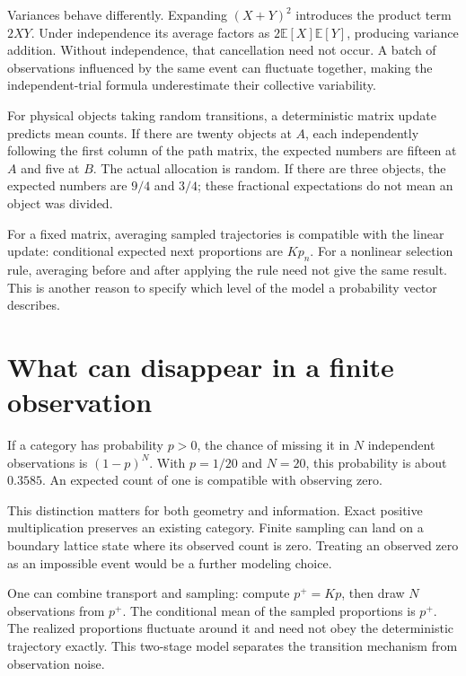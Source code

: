 \documentclass[11pt,oneside,openany]{book}
\theoremstyle{definition}
\theoremstyle{remark}
\numberwithin{equation}{chapter}
\begin{document}
Variances behave differently. Expanding \((X+Y)^2\) introduces the product term \(2XY\). Under independence its average factors as \(2\mathbb E[X]\mathbb E[Y]\), producing variance addition. Without independence, that cancellation need not occur. A batch of observations influenced by the same event can fluctuate together, making the independent-trial formula underestimate their collective variability.

For physical objects taking random transitions, a deterministic matrix update predicts mean counts. If there are twenty objects at \(A\), each independently following the first column of the path matrix, the expected numbers are fifteen at \(A\) and five at \(B\). The actual allocation is random. If there are three objects, the expected numbers are \(9/4\) and \(3/4\); these fractional expectations do not mean an object was divided.

For a fixed matrix, averaging sampled trajectories is compatible with the linear update: conditional expected next proportions are \(Kp_n\). For a nonlinear selection rule, averaging before and after applying the rule need not give the same result. This is another reason to specify which level of the model a probability vector describes.

\section{What can disappear in a finite observation}\label{ch04-what-can-disappear-in-a-finite-observation}

If a category has probability \(p>0\), the chance of missing it in \(N\) independent observations is \((1-p)^N\). With \(p=1/20\) and \(N=20\), this probability is about \(0.3585\). An expected count of one is compatible with observing zero.

This distinction matters for both geometry and information. Exact positive multiplication preserves an existing category. Finite sampling can land on a boundary lattice state where its observed count is zero. Treating an observed zero as an impossible event would be a further modeling choice.

One can combine transport and sampling: compute \(p^+=Kp\), then draw \(N\) observations from \(p^+\). The conditional mean of the sampled proportions is \(p^+\). The realized proportions fluctuate around it and need not obey the deterministic trajectory exactly. This two-stage model separates the transition mechanism from observation noise.
\end{document}
